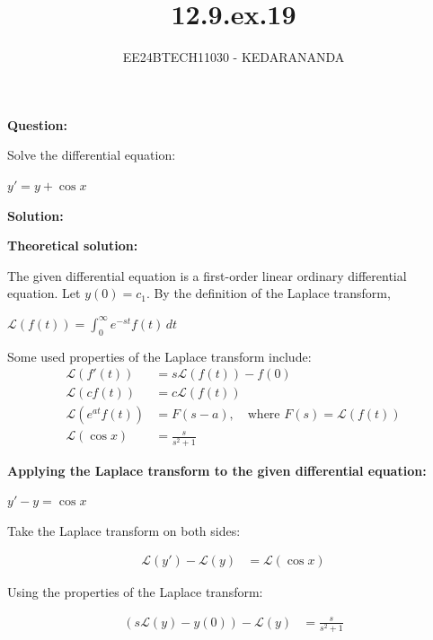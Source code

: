 \documentclass[journal]{IEEEtran}
\begin{document}
	
	
	\vspace{3cm}
	
	\title{12.9.ex.19}
	\author{EE24BTECH11030 - KEDARANANDA}
	{\let\newpage\relax\maketitle}
	
	\renewcommand{\thefigure}{\theenumi}
	\renewcommand{\thetable}{\theenumi}
	\setlength{\intextsep}{10pt} %
	\textbf{Question:}
	
	Solve the differential equation:
	
	$y' = y + \cos x$
	
	\textbf{Solution:}
	
	\textbf{Theoretical solution:}
	
	The given differential equation is a first-order linear ordinary differential equation. Let $y(0) = c_1$. By the definition of the Laplace transform,
	
	$\mathcal{L}(f(t)) = \int_0^\infty e^{-st} f(t) \, dt$
	
	Some used properties of the Laplace transform include:
	\begin{align}
		\mathcal{L}(f'(t)) &= s\mathcal{L}(f(t)) - f(0) \\
		\mathcal{L}(cf(t)) &= c\mathcal{L}(f(t)) \\
		\mathcal{L}(e^{at}f(t)) &= F(s - a), \quad \text{where } F(s) = \mathcal{L}(f(t)) \\
		\mathcal{L}(\cos x) &= \frac{s}{s^2 + 1}
	\end{align}
	
	\textbf{Applying the Laplace transform to the given differential equation:}
	
	$y' - y = \cos x$
	
	Take the Laplace transform on both sides:
	
	\begin{align}
		\mathcal{L}(y') - \mathcal{L}(y) &= \mathcal{L}(\cos x)
	\end{align}
	
	Using the properties of the Laplace transform:
	
	\begin{align}
		(s\mathcal{L}(y) - y(0)) - \mathcal{L}(y) &= \frac{s}{s^2 + 1}
	\end{align}
	
\end{document}
